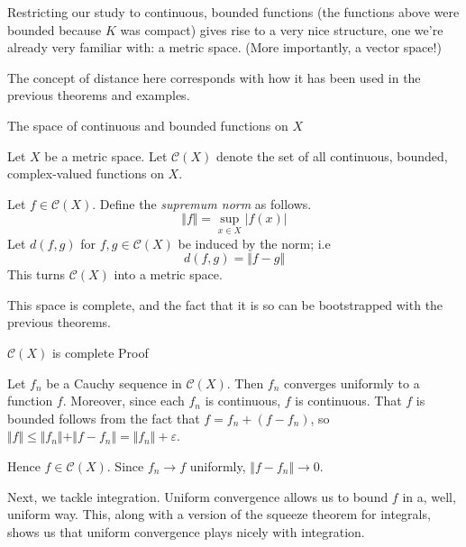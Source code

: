 Restricting our study to continuous, bounded functions (the functions above were bounded because $K$ was compact) gives rise to a very nice structure, one we're already very familiar with: a metric space. (More importantly, a vector space!)

The concept of distance here corresponds with how it has been used in the previous theorems and examples.

\begin{definition}The space of continuous and bounded functions on $X$

    Let $X$ be a metric space. Let $\mathscr{C}(X)$ denote the set of all continuous, bounded, complex-valued functions on $X$.

    Let $f \in \mathscr{C}(X)$. Define the \textit{supremum norm} as follows.
    \[\Vert f \Vert = \sup_{x \in X} |f(x)|\]
    Let $d(f, g)$ for $f, g \in \mathscr{C}(X)$ be induced by the norm; i.e
    \[d(f, g) = \Vert f - g \Vert\]
    This turns $\mathscr{C}(X)$ into a metric space.
\end{definition}

This space is complete, and the fact that it is so can be bootstrapped with the previous theorems.

\begin{consequence} $\mathscr{C}(X)$ is complete
    {Proof}

    Let $f_n$ be a Cauchy sequence in $\mathscr{C}(X)$. Then $f_n$ converges uniformly to a function $f$. Moreover, since each $f_n$ is continuous, $f$ is continuous. That $f$ is bounded follows from the fact that $f = f_n + (f - f_n)$, so $\Vert f \Vert \leq \Vert f_n \Vert + \Vert f - f_n \Vert = \Vert f_n \Vert + \varepsilon$. 

    Hence $f \in \mathscr{C}(X)$. Since $f_n \rightarrow f$ uniformly, $\Vert f - f_n \Vert \rightarrow 0$.
\end{consequence}


Next, we tackle integration. Uniform convergence allows us to bound $f$ in a, well, uniform way. This, along with a version of the squeeze theorem for integrals, shows us that uniform convergence plays nicely with integration.

